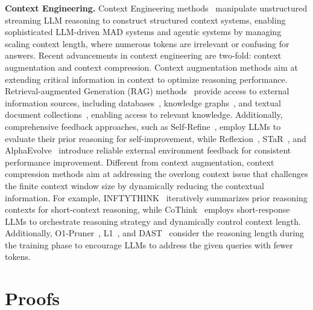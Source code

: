 \documentclass{article} %
\theoremstyle{plain}
\begin{document}
\textbf{Context Engineering.} 
Context Engineering methods~\citep{mei2025survey} manipulate unstructured streaming LLM reasoning to construct structured context systems, enabling sophisticated LLM-driven MAD systems and agentic systems by managing scaling context length, where numerous tokens are irrelevant or confusing for answers.
Recent advancements in context engineering are two-fold: context augmentation and context compression.
Context augmentation methods aim at extending critical information in context to optimize reasoning performance. Retrieval-augmented Generation (RAG) methods~\citep{lewis2020retrieval, gao2023retrieval, fan2024survey} provide access to external information sources, including databases~\citep{lian2024chatbi}, knowledge graphs~\citep{sun2024thinkongraph, luo2024reasoning}, and textual document collections~\citep{asai2024selfrag, sarthi2024raptor}, enabling access to relevant knowledge. Additionally, comprehensive feedback approaches, such as Self-Refine~\citep{madaan2023selfrefine}, employ LLMs to evaluate their prior reasoning for self-improvement, while Reflexion~\citep{shinn2023reflexion}, STaR~\citep{zelikman2022star}, and AlphaEvolve~\citep{novikov2025alphaevolve} introduce reliable external environment feedback for consistent performance improvement.
Different from context augmentation, context compression methods aim at addressing the overlong context issue that challenges the finite context window size by dynamically reducing the contextual information. For example, INFTYTHINK~\citep{yan2025inftythink} iteratively summarizes prior reasoning contexts for short-context reasoning, while CoThink~\citep{fan2025cothink} employs short-response LLMs to orchestrate reasoning strategy and dynamically control context length. Additionally, O1-Pruner~\citep{luo2025o1}, L1~\citep{aggarwal2025l}, and DAST~\citep{dast} consider the reasoning length during the training phase to encourage LLMs to address the given queries with fewer tokens.



\section{Proofs}
\label{appendix:proofs}
\end{document}
